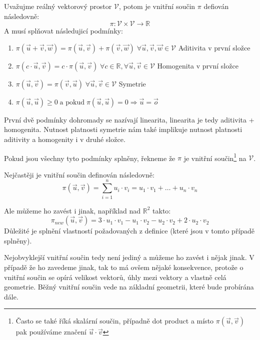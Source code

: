 \begin{definition}
    Uvažujme reálný vektorový prostor $\mathcal{V}$, potom je vnitřní součin $\pi$ defiován následovně:
    $$\pi: \mathcal{V} \times \mathcal{V} \rightarrow \mathbb{R}$$
    A musí splňovat následujicí podmínky:
    \begin{enumerate}
        \item $\pi(\vec{u} + \vec{v}, \vec{w}) = \pi(\vec{u}, \vec{v}) + \pi(\vec{v}, \vec{w})\;
        \forall \vec{u}, \vec{v}, \vec{w} \in \mathcal{V}$ \hfill Aditivita v první složce

        \item $\pi(c \cdot \vec{u}, \vec{v}) = c \cdot \pi(\vec{u}, \vec{v})\; \forall c\in \mathbb{R},
        \forall \vec{u}, \vec{v} \in \mathcal{V}$ \hfill Homogenita v první složce

        \item $\pi(\vec{u}, \vec{v}) = \pi(\vec{v}, \vec{u})\;
        \forall \vec{u}, \vec{v} \in \mathcal{V}$ \hfill Symetrie

        \item $\pi(\vec{u}, \vec{u}) \geq 0\;\text{a pokud}\; \pi(\vec{u}, \vec{u}) = 0 \Rightarrow \vec{u} = \vec{o}$
    \end{enumerate}
    První dvě podmínky dohromady se nazívají linearita, linearita je tedy aditivita + homogenita. Nutnost platnosti
    symetrie nám také implikuje nutnost platnosti aditivity a homogenity i v druhé složce.

    Pokud jsou všechny tyto podmínky splněny, řekneme že $\pi$ je vnitřní součin\footnote{Často se také říká
    skalární součin, případně dot product a místo $\pi(\vec{u}, \vec{v})$ pak používáme
    značení $\vec{u} \cdot \vec{v}$} na $\mathcal{V}$.
\end{definition}

Nejčastěji je vnitřní součin definován následovně:
$$\pi(\vec{u}, \vec{v}) = \sum_{i=1}^n u_i \cdot v_i = u_1 \cdot v_1 + \ldots + u_n \cdot v_n$$

Ale můžeme ho zavést i jinak, například nad $\mathbb{R}^2$ takto:
$$\pi_{new}(\vec{u}, \vec{v}) = 3\cdot u_1 \cdot v_1 - u_1 \cdot v_2 - u_2 \cdot v_2 + 2 \cdot u_2 \cdot v_2$$
Důležité je splnění vlastností požadovaných z definice (které jsou v tomto případě splněny).

Nejobvyklejší vnitřní součin tedy není jediný a můžeme ho zavést i nějak jinak. V případě že ho zavedeme jinak,
tak to má ovšem nějaké konsekvence, protože o vnitřní součin se opírá velikost vektorů, úhly mezi vektory a
vlastně celá geometrie. Běžný vnitřní součin vede na základní  geometrii, které bude probírána
dále.

